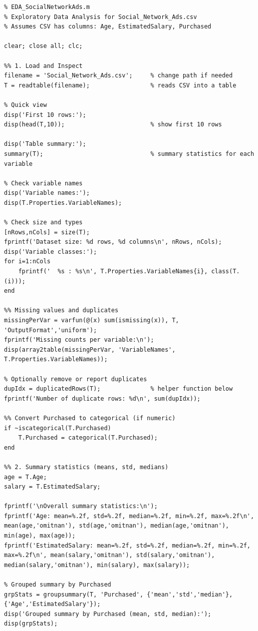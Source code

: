 \documentclass[11pt,a4paper]{article}
\begin{document}
\begin{verbatim}
% EDA_SocialNetworkAds.m
% Exploratory Data Analysis for Social_Network_Ads.csv
% Assumes CSV has columns: Age, EstimatedSalary, Purchased

clear; close all; clc;

%% 1. Load and Inspect
filename = 'Social_Network_Ads.csv';     % change path if needed
T = readtable(filename);                 % reads CSV into a table

% Quick view
disp('First 10 rows:');
disp(head(T,10));                        % show first 10 rows

disp('Table summary:');
summary(T);                              % summary statistics for each variable

% Check variable names
disp('Variable names:');
disp(T.Properties.VariableNames);

% Check size and types
[nRows,nCols] = size(T);
fprintf('Dataset size: %d rows, %d columns\n', nRows, nCols);
disp('Variable classes:');
for i=1:nCols
    fprintf('  %s : %s\n', T.Properties.VariableNames{i}, class(T.(i)));
end

%% Missing values and duplicates
missingPerVar = varfun(@(x) sum(ismissing(x)), T, 'OutputFormat','uniform');
fprintf('Missing counts per variable:\n');
disp(array2table(missingPerVar, 'VariableNames', T.Properties.VariableNames));

% Optionally remove or report duplicates
dupIdx = duplicatedRows(T);              % helper function below
fprintf('Number of duplicate rows: %d\n', sum(dupIdx));

%% Convert Purchased to categorical (if numeric)
if ~iscategorical(T.Purchased)
    T.Purchased = categorical(T.Purchased);
end

%% 2. Summary statistics (means, std, medians)
age = T.Age;
salary = T.EstimatedSalary;

fprintf('\nOverall summary statistics:\n');
fprintf('Age: mean=%.2f, std=%.2f, median=%.2f, min=%.2f, max=%.2f\n', mean(age,'omitnan'), std(age,'omitnan'), median(age,'omitnan'), min(age), max(age));
fprintf('EstimatedSalary: mean=%.2f, std=%.2f, median=%.2f, min=%.2f, max=%.2f\n', mean(salary,'omitnan'), std(salary,'omitnan'), median(salary,'omitnan'), min(salary), max(salary));

% Grouped summary by Purchased
grpStats = groupsummary(T, 'Purchased', {'mean','std','median'}, {'Age','EstimatedSalary'});
disp('Grouped summary by Purchased (mean, std, median):');
disp(grpStats);


\end{verbatim}
\end{document}
